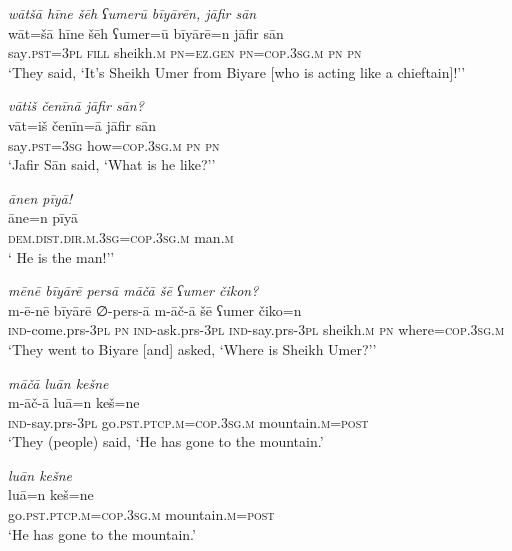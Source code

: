 \ea \label{ŠJ.15}
\textit{wātšā hīne šēh ʕumerū bīyārēn, jāfir sān} \\ 
\gll wāt=šā hīne šēh ʕumer=ū bīyārē=n jāfir sān \\ 
 say\textsc{.pst}\textsc{=3pl} \textsc{fill} sheikh\textsc{.m} \textsc{pn}\textsc{=ez.gen} \textsc{pn}\textsc{=cop}\textsc{.3sg}\textsc{.m} \textsc{pn} \textsc{pn} \\ 
\glt `They said, ‘It’s Sheikh Umer from Biyare [who is acting like a chieftain]!’'
\z 
 
\ea \label{ŠJ.16}
\textit{vātiš čenīnā jāfir sān?} \\ 
\gll vāt=iš čenīn=ā jāfir sān \\ 
 say\textsc{.pst}\textsc{=3sg} how\textsc{=cop}\textsc{.3sg}\textsc{.m} \textsc{pn} \textsc{pn} \\ 
\glt `Jafir Sān said, ‘What is he like?’'
\z 
 
\ea \label{ŠJ.19}
\textit{ānen pīyā!} \\ 
\gll āne=n pīyā \\ 
 \textsc{dem.dist}\textsc{.dir}\textsc{.m}\textsc{.3sg}\textsc{=cop}\textsc{.3sg}\textsc{.m} man\textsc{.m} \\ 
\glt ` He is the man!’'
\z 
 
\ea \label{ŠJ.22}
\textit{mēnē bīyārē persā māčā šē ʕumer čikon?} \\ 
\gll m-ē-nē bīyārē ∅-pers-ā m-āč-ā šē ʕumer čiko=n \\ 
 \textsc{ind-}come.prs\textsc{-3pl} \textsc{pn} \textsc{ind-}ask.prs\textsc{-3pl} \textsc{ind-}say.prs\textsc{-3pl} sheikh\textsc{.m} \textsc{pn} where\textsc{=cop}\textsc{.3sg}\textsc{.m} \\ 
\glt `They went to Biyare [and] asked, ‘Where is Sheikh Umer?’'
\z 
 
\ea \label{ŠJ.23}
\textit{māčā luān kešne} \\ 
\gll m-āč-ā luā=n keš=ne \\ 
 \textsc{ind-}say.prs\textsc{-3pl} go\textsc{.pst}\textsc{.ptcp}\textsc{.m}\textsc{=cop}\textsc{.3sg}\textsc{.m} mountain\textsc{.m}\textsc{=\textsc{post}} \\ 
\glt `They (people) said, ‘He has gone to the mountain.'
\z 
 
\ea \label{ŠJ.24}
\textit{luān kešne} \\ 
\gll luā=n keš=ne \\ 
 go\textsc{.pst}\textsc{.ptcp}\textsc{.m}\textsc{=cop}\textsc{.3sg}\textsc{.m} mountain\textsc{.m}\textsc{=\textsc{post}} \\ 
\glt `He has gone to the mountain.'
\z 
 
